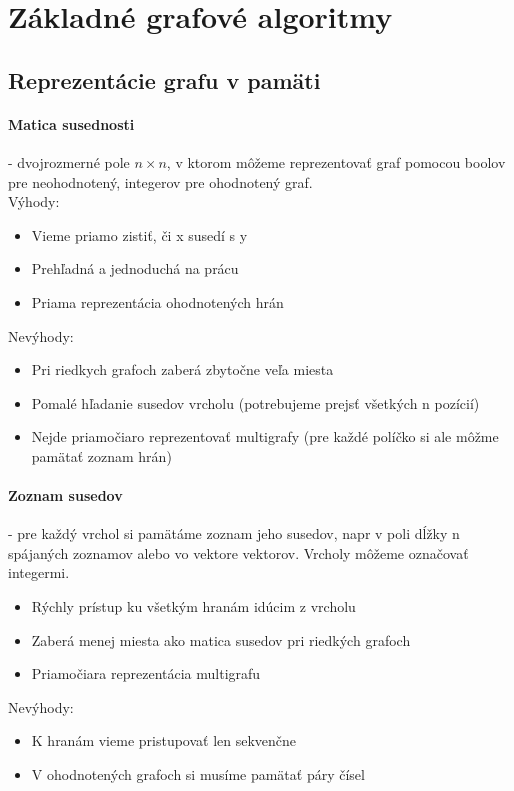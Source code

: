 \section{Základné grafové algoritmy}

	\subsection{Reprezentácie grafu v pamäti}

		\paragraph{Matica susednosti} - dvojrozmerné pole $n \times n$, v ktorom môžeme reprezentovať graf pomocou boolov pre neohodnotený, integerov pre ohodnotený graf. \\
		Výhody:
		\begin{itemize}
			\item Vieme priamo zistiť, či x susedí s y
			\item Prehľadná a jednoduchá na prácu
			\item Priama reprezentácia ohodnotených hrán
		\end{itemize}
		Nevýhody:
		\begin{itemize}
			\item Pri riedkych grafoch zaberá zbytočne veľa miesta
			\item Pomalé hľadanie susedov vrcholu (potrebujeme prejsť všetkých n pozícií)
			\item Nejde priamočiaro reprezentovať multigrafy (pre každé políčko si ale môžme pamätať zoznam hrán)
		\end{itemize}

		\paragraph{Zoznam susedov} - pre každý vrchol si pamätáme zoznam jeho susedov, napr v poli dĺžky n spájaných zoznamov alebo vo vektore vektorov. Vrcholy môžeme označovať integermi.
		\begin{itemize}
			\item Rýchly prístup ku všetkým hranám idúcim z vrcholu
			\item Zaberá menej miesta ako matica susedov pri riedkých grafoch
			\item Priamočiara reprezentácia multigrafu
		\end{itemize}
		Nevýhody:
		\begin{itemize}
			\item K hranám vieme pristupovať len sekvenčne
			\item V ohodnotených grafoch si musíme pamätať páry čísel
		\end{itemize}


